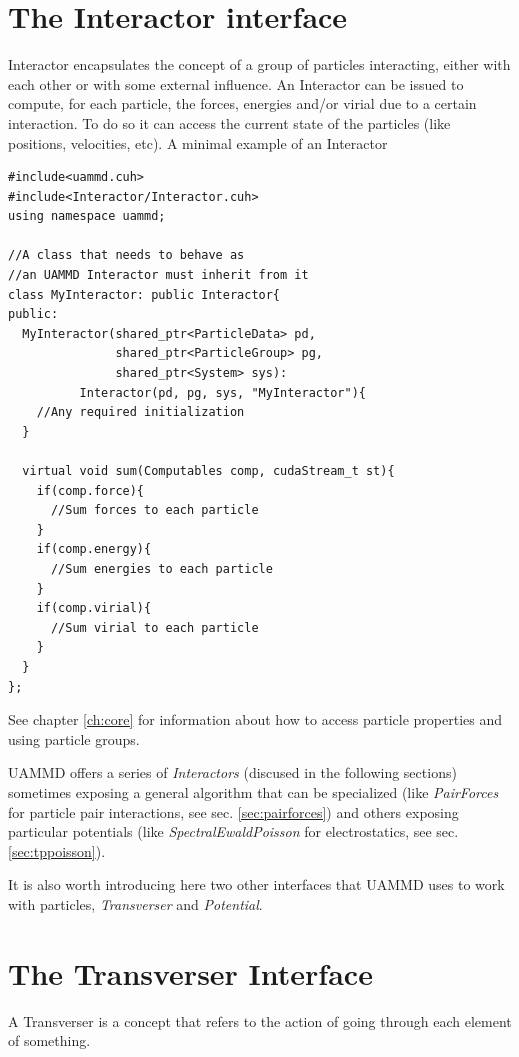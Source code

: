 \documentclass[ twoside,openright,titlepage,numbers=noenddot,%
headinclude,footinclude,cleardoublepage=empty,abstract=on,
BCOR=5mm,paper=a4,fontsize=11pt, dvipsnames
]{scrreprt}
\def\ucpp{uammd_cpp_lexer.py:UAMMDCppLexer -x}
\newcommand{\uammd}{\gls{UAMMD}\xspace}
\begin{document}
\section{The Interactor interface} \label{sec:interactor}

Interactor encapsulates the concept of a group of particles interacting, either with each other or with some external influence.
An Interactor can be issued to compute, for each particle, the forces, energies and/or virial due to a certain interaction.
To do so it can access the current state of the particles (like positions, velocities, etc).
A minimal example of an Interactor

\begin{verbatim}
#include<uammd.cuh>
#include<Interactor/Interactor.cuh>
using namespace uammd;

//A class that needs to behave as 
//an UAMMD Interactor must inherit from it
class MyInteractor: public Interactor{
public:
  MyInteractor(shared_ptr<ParticleData> pd,
               shared_ptr<ParticleGroup> pg,
               shared_ptr<System> sys):
          Interactor(pd, pg, sys, "MyInteractor"){
    //Any required initialization 
  }

  virtual void sum(Computables comp, cudaStream_t st){
    if(comp.force){
      //Sum forces to each particle
    }
    if(comp.energy){
      //Sum energies to each particle
    }
    if(comp.virial){
      //Sum virial to each particle
    }
  }
};
\end{verbatim}
See chapter \ref{ch:core} for information about how to access particle properties and using particle groups.

\uammd offers a series of \emph{Interactors} (discused in the following sections) sometimes exposing a general algorithm that can be specialized (like \emph{PairForces} for particle pair interactions, see sec. \ref{sec:pairforces}) and others exposing particular potentials (like \emph{SpectralEwaldPoisson} for electrostatics, see sec. \ref{sec:tppoisson}).

It is also worth introducing here two other interfaces that \uammd uses to work with particles, \emph{Transverser} and \emph{Potential}.
\section{The Transverser Interface} \label{sec:transverser} 
A Transverser is a concept that refers to the action of going through each element of something.  
\end{document}
